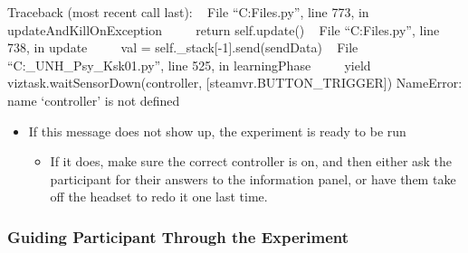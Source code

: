 \documentclass[
]{article}
\providecommand{\tightlist}{%
  \setlength{\itemsep}{0pt}\setlength{\parskip}{0pt}}
\begin{document}
Traceback (most recent call last): ~ File
``C:\Program Files\WorldViz{}\python\viztask.py'', line 773, in
updateAndKillOnException ~~~~ return self.update() ~ File
``C:\Program Files\WorldViz{}\python\viztask.py'', line 738, in
update ~~~~ val = self.\_stack{[}-1{]}.send(sendData) ~ File
``C:\Users\svc\_UNH\_Psy\_Ksk01\Desktop\EnsembleExperiment\Experiment.py'',
line 525, in learningPhase ~~~~ yield viztask.waitSensorDown(controller,
{[}steamvr.BUTTON\_TRIGGER{]}) NameError: name `controller' is not
defined

\begin{itemize}
\tightlist
\item
  If this message does not show up, the experiment is ready to be run

  \begin{itemize}
  \tightlist
  \item
    If it does, make sure the correct controller is on, and then either
    ask the participant for their answers to the information panel, or
    have them take off the headset to redo it one last time.
  \end{itemize}
\end{itemize}

\hypertarget{guiding-participant-through-the-experiment}{%
\subsubsection{Guiding Participant Through the
Experiment}\label{guiding-participant-through-the-experiment}}
\end{document}
